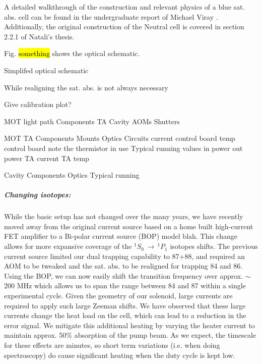 A detailed walkthrough of the construction and relevant physics of a blue sat. abs. cell can be found in the undergraduate report of Michael Viray \cite{MichaelViray2014}.
Additionally, the original construction of the Neutral cell is covered in section 2.2.1 of Natali's thesis.

Fig. \hl{something} shows the optical schematic.



Simplifed optical schematic

While realigning the sat. abs. is not always necessary

Give calibration plot?

MOT light path
	Components
		TA
		Cavity
		AOMs
		Shutters
	
	MOT TA
		Components
			Mounts
			Optics
			Circuits
				current control board
				temp control board
					note the thermistor in use
		Typical running values
			in power
			out power
			TA current
			TA temp
		
	Cavity
		Components
			Optics
		Typical running
		
\subparagraph{Changing isotopes:} \label{para:change_iso}
While the basic setup has not changed over the many years, we have recently moved away from the original current source based on a home built high-current FET amplifier to a Bi-polar current source (BOP) model blah. 
This change allows for more expansive coverage of the $^1S_0\,\rightarrow\,^1P_1$ isotopes shifts. The previous current source limited our dual trapping capability to 87+88, and required an AOM to be tweaked and the sat. abs. to be realigned for trapping 84 and 86. 
Using the BOP, we can now easily shift the transition frequency over approx. $\sim$200 MHz which allows us to span the range between 84 and 87 within a single experimental cycle.
Given the geometry of our solenoid, large currents are required to apply such large Zeeman shifts.
We have observed that these large currents change the heat load on the cell, which can lead to a reduction in the error signal.
We mitigate this additional heating by varying the heater current to maintain approx. 50\% absorption of the pump beam.
As we expect, the timescale for these effects are minutes, so short term variations (i.e. when doing spectroscopy) do cause significant heating when the duty cycle is kept low.

